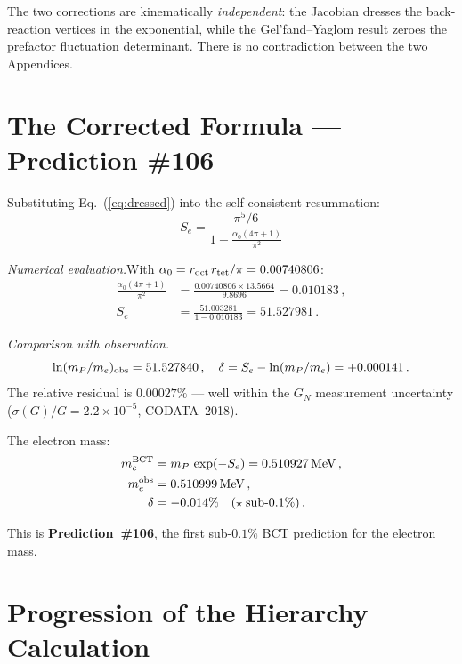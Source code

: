 \documentclass[twocolumn,10pt,a4paper]{article}
\begin{document}
The two corrections are kinematically \emph{independent}: the Jacobian
dresses the back-reaction vertices in the exponential, while the
Gel'fand--Yaglom result zeroes the prefactor fluctuation determinant.
There is no contradiction between the two Appendices.

\section{The Corrected Formula --- Prediction \#106}

Substituting Eq.~(\ref{eq:dressed}) into the self-consistent resummation:
\begin{equation}
  \label{eq:master}
  \boxed{S_e = \frac{\pi^5/6}{\displaystyle 1 - \frac{\alpha_0(4\pi+1)}{\pi^2}}}
\end{equation}

\textit{Numerical evaluation.}\quad With $\alpha_0 = r_{\rm oct}\,r_{\rm tet}/\pi
= 0.00740806$:
\begin{align}
  \frac{\alpha_0(4\pi+1)}{\pi^2} &= \frac{0.00740806 \times 13.5664}{9.8696}
  = 0.010183\,, \label{eq:denom}\\
  S_e &= \frac{51.003281}{1 - 0.010183} = 51.527981\,.\label{eq:Se_num}
\end{align}

\textit{Comparison with observation.}\quad
\begin{equation}
  \ln(m_P/m_e)_{\rm obs} = 51.527840\,,\quad
  \delta = S_e - \ln(m_P/m_e) = +0.000141\,.
\end{equation}
The relative residual is $0.00027\%$ --- well within the $G_N$ measurement
uncertainty ($\sigma(G)/G = 2.2\times10^{-5}$, CODATA~2018).

The electron mass:
\begin{align}
  m_e^{\rm BCT} &= m_P\,\exp(-S_e) = 0.510927\,\mathrm{MeV}\,,\\
  m_e^{\rm obs} &= 0.510999\,\mathrm{MeV}\,,\\
  \delta &= -0.014\%\quad(\star\;\text{sub-}0.1\%)\,.
\end{align}

This is \textbf{Prediction~\#106}, the first sub-$0.1\%$ BCT prediction
for the electron mass.

\section{Progression of the Hierarchy Calculation}
\end{document}
